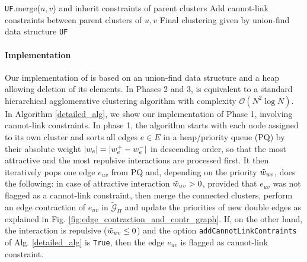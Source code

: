 {\begin{algorithm*}[p]
\begin{algorithmic}[1]
           
              
              \State \texttt{UF}.merge($u,v$) and inherit constraints of parent clusters
              \State Add cannot-link constraints between parent clusters of $u,v$
            \EndIf
          \EndIf
        \EndFor
        \State
        \Return Final clustering given by union-find data structure \texttt{UF}
    \end{algorithmic}
    \label{alg:mutex_watershed}
  \end{algorithm*}
  \clearpage
}

\paragraph{Implementation} Our implementation of \algname{} is based on an union-find data structure and a heap allowing deletion of its elements. 
In Phases 2 and 3, \algname{} is equivalent to a standard hierarchical agglomerative clustering algorithm with complexity $\mathcal{O}(N^2 \log N)$. In Algorithm \ref{detailed_alg}, we show our implementation of Phase 1, involving cannot-link constraints.
In phase 1, the algorithm starts with each node assigned to its own cluster and sorts all edges $e\in E$ in a heap/priority queue (PQ) by their absolute weight $|w_e|=|w_e^+ - w_e^-|$ in descending order, so that the most attractive and the most repulsive interactions are processed first. It then iteratively pops one edge $e_{uv}$ from PQ and, depending on the priority $\tilde{w}_{uv}$, does the following: in case of attractive interaction $\tilde{w}_{uv}>0$, provided that $e_{uv}$ was not flagged as a cannot-link constraint, then merge the connected clusters, perform an edge contraction of $e_{uv}$ in $\tilde{\mathcal{G}}_\Pi$ and update the priorities of new double edges as explained in Fig. \ref{fig:edge_contraction_and_contr_graph}. 
If, on the other hand, the interaction is repulsive ($\tilde{w}_{uv}\leq 0$) and the option \texttt{addCannotLinkContraints} of Alg. \ref{detailed_alg} is \texttt{True}, then the edge $e_{uv}$ is flagged as cannot-link constraint.


